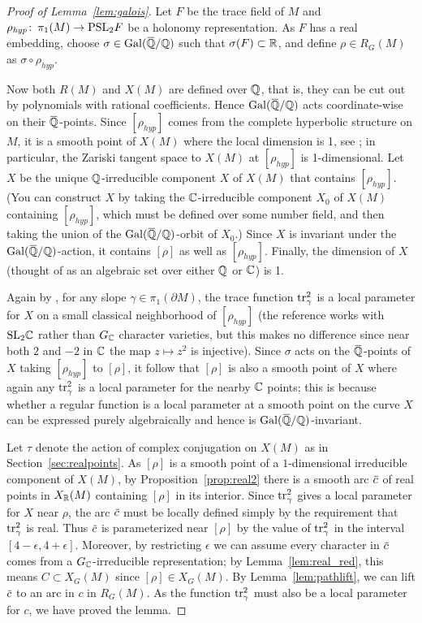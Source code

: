\documentclass[tikz, sepfignums, defaultenums]{nmd/article}
\newcommand{\SLcharvar}[1]{X\left(#1\right)}
\newcommand{\RG}[1]{\mathit{R}_{G}\left(#1\right)}
\newcommand{\XG}[1]{\mathit{X}_{G}\left(#1\right)}
\newcommand{\GC}{G_\C}
\newcommand{\rhohyp}{\rho_{\mathit{hyp}}}
\begin{document}
\begin{proof}[Proof of Lemma~\ref{lem:galois}]
Let $F$ be the trace field of $M$ and
$\rhohyp \maps \pi_1(M) \to \PSL{2}{F}$ be a holonomy representation.
As $F$ has a real embedding, choose $\sigma \in \Gal(\QQbar/\Q)$ such
that $\sigma(F) \subset {\mathbb R}$, and define $\rho \in \RG{M}$ as
$\sigma \circ \rhohyp$.

Now both $R(M)$ and $X(M)$ are defined over ${\mathbb Q}$, that is, they can be
cut out by polynomials with rational coefficients.  Hence
$\Gal(\QQbar/\Q)$ acts coordinate-wise on their $\QQbar$-points.
Since $[\rhohyp]$ comes from the complete hyperbolic structure on $M$,
it is a smooth point of $\SLcharvar{M}$ where the local dimension is
1, see \cite[Corollaire~3.28]{Porti1997}; in particular, the Zariski
tangent space to $X(M)$ at $[\rhohyp]$ is 1-dimensional.  Let $X$ be
the unique ${\mathbb Q}$-irreducible component $X$ of $\SLcharvar{M}$ that
contains $[\rhohyp]$.  (You can construct $X$ by taking the
${\mathbb C}$-irreducible component $X_0$ of $\SLcharvar{M}$ containing
$[\rhohyp]$, which must be defined over some number field, and then
taking the union of the $\Gal(\QQbar/\Q)$-orbit of $X_0$.)  Since $X$
is invariant under the $\Gal(\QQbar/\Q)$-action, it contains $[\rho]$
as well as $[\rhohyp]$. Finally, the dimension of $X$ (thought of as
an algebraic set over either ${\mathbb Q}$ or ${\mathbb C}$) is 1.

Again by \cite[Corollaire~3.28]{Porti1997}, for any slope
$\gamma \in \pi_1(\partial M)$, the trace function $\operatorname{tr}^2_\gamma$ is a
local parameter for $X$ on a small classical neighborhood of
$[\rhohyp]$ (the reference \cite{Porti1997} works with $\mathrm{ SL}_{2} {\mathbb C}$
rather than $\GC$ character varieties, but this makes no difference
since near both $2$ and $-2$ in ${\mathbb C}$ the map $z \mapsto z^2$ is
injective).  Since $\sigma$ acts on the $\QQbar$-points of $X$ taking
$[\rhohyp]$ to $[\rho]$, it follow that $[\rho]$ is also a smooth
point of $X$ where again any $\operatorname{tr}^2_\gamma$ is a local parameter for
the nearby ${\mathbb C}$ points; this is because whether a regular function is
a local parameter at a smooth point on the curve $X$ can be expressed
purely algebraically and hence is $\Gal(\QQbar/\Q)$-invariant.

Let $\tau$ denote the action of complex conjugation on $X(M)$ as in
Section~\ref{sec:realpoints}.  As $[\rho]$ is a smooth point of a
$1$-dimensional irreducible component of $X(M)$, by
Proposition~\ref{prop:real2} there is a smooth arc $\cbar$ of real
points in $X_{\mathbb R}(M)$ containing $[\rho]$ in its interior.  Since
$\operatorname{tr}^2_\gamma$ gives a local parameter for $X$ near $\rho$, the arc
$\cbar$ must be locally defined simply by the requirement that
$\operatorname{tr}^2_\gamma$ is real. Thus $\cbar$ is parameterized near $[\rho]$ by
the value of $\operatorname{tr}^2_\gamma$ in the interval
$[4 - \epsilon, 4 + \epsilon]$.  Moreover, by restricting $\epsilon$
we can assume every character in $\cbar$ comes from a
$\GC$-irreducible representation; by Lemma~\ref{lem:real_red}, this
means $C \subset \XG{M}$ since $[\rho] \in \XG{M}$.  By
Lemma~\ref{lem:pathlift}, we can lift $\cbar$ to an arc in $c$ in
$\RG{M}$.  As the function $\operatorname{tr}_\gamma^2$ must also be a local
parameter for $c$, we have proved the lemma.
\end{proof}
\end{document}
